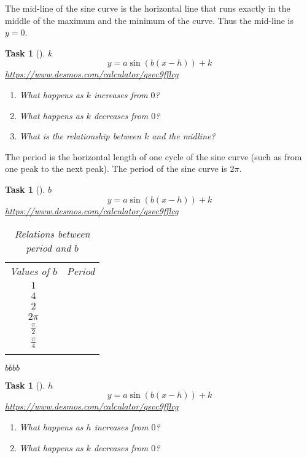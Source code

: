 \documentclass[10pt,]{article}
\theoremstyle{plain}
\newtheorem{proposition}[theorem]{Task}
\theoremstyle{definition}
\numberwithin{equation}{section}
\newcommand{\hrulemedium}{\noalign{\hrule height 0.07em}}
\begin{document}
\hypertarget{p-128}{}%
The mid-line of the sine curve is the horizontal line that runs exactly in the middle of the maximum and the minimum of the curve. Thus the mid-line is \(y=0\).%
\begin{proposition}[{}]\label{proposition-61}
\(k\)%
\begin{equation*}
y=a\sin(b(x-h))+k
\end{equation*}
\href{https://www.desmos.com/calculator/qsvc9fflcg}{https://www.desmos.com/calculator/qsvc9fflcg}\leavevmode%
\begin{enumerate}
\item\hypertarget{li-272}{}What happens as \(k\) increases from \(0\)?%
\item\hypertarget{li-273}{}What happens as \(k\) decreases from \(0\)?%
\item\hypertarget{li-274}{}What is the relationship between \(k\) and the midline?%
\end{enumerate}
\end{proposition}
\hypertarget{p-129}{}%
The period is the horizontal length of one cycle of the sine curve (such as from one peak to the next peak). The period of the sine curve is \(2\pi\).%
\begin{proposition}[{}]\label{proposition-62}
\(b\)%
\begin{equation*}
y=a\sin(b(x-h))+k
\end{equation*}
\href{https://www.desmos.com/calculator/qsvc9fflcg}{https://www.desmos.com/calculator/qsvc9fflcg}\begin{table}
\centering
\begin{tabular}{cc}\hrulemedium
Values of \(b\)&Period\tabularnewline\hrulemedium
\(1\)&\(\)\tabularnewline\hrulemedium
\(4\)&\(\)\tabularnewline\hrulemedium
\(2\)&\(\)\tabularnewline\hrulemedium
\(2\pi\)&\(\)\tabularnewline\hrulemedium
\(\frac{\pi}{2}\)&\(\)\tabularnewline\hrulemedium
\(\frac{\pi}{4}\)&\(\)\tabularnewline\hrulemedium
\end{tabular}
\caption{Relations between period and \(b\)\label{table-9}}
\end{table}
\(b\)\(b\)\(b\)\(b\)\end{proposition}
\begin{proposition}[{}]\label{proposition-63}
\(h\)%
\begin{equation*}
y=a\sin(b(x-h))+k
\end{equation*}
\href{https://www.desmos.com/calculator/qsvc9fflcg}{https://www.desmos.com/calculator/qsvc9fflcg}\leavevmode%
\begin{enumerate}
\item\hypertarget{li-275}{}What happens as \(h\) increases from \(0\)?%
\item\hypertarget{li-276}{}What happens as \(k\) decreases from \(0\)?%
\end{enumerate}
\end{proposition}
\end{document}
